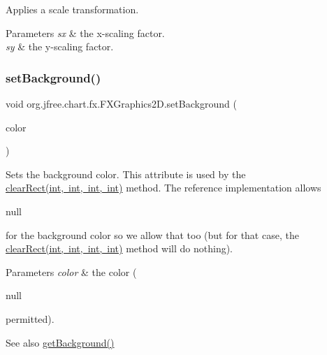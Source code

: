 Applies a scale transformation.


\begin{DoxyParams}{Parameters}
{\em sx} & the x-\/scaling factor. \\
\hline
{\em sy} & the y-\/scaling factor. \\
\hline
\end{DoxyParams}
\mbox{\label{classorg_1_1jfree_1_1chart_1_1fx_1_1_f_x_graphics2_d_a51d0f635dc7888223c326861aa4849f2}} 
\subsubsection{\texorpdfstring{set\+Background()}{setBackground()}}
{\footnotesize\ttfamily void org.\+jfree.\+chart.\+fx.\+F\+X\+Graphics2\+D.\+set\+Background (\begin{DoxyParamCaption}\item[{Color}]{color }\end{DoxyParamCaption})}

Sets the background color. This attribute is used by the \mbox{\hyperlink{classorg_1_1jfree_1_1chart_1_1fx_1_1_f_x_graphics2_d_afd91faf8ad68982c6c1be9931e7976c8}{clear\+Rect(int, int, int, int)}} method. The reference implementation allows
\begin{DoxyCode}
null 
\end{DoxyCode}
 for the background color so we allow that too (but for that case, the \mbox{\hyperlink{classorg_1_1jfree_1_1chart_1_1fx_1_1_f_x_graphics2_d_afd91faf8ad68982c6c1be9931e7976c8}{clear\+Rect(int, int, int, int)}} method will do nothing).


\begin{DoxyParams}{Parameters}
{\em color} & the color (
\begin{DoxyCode}
null 
\end{DoxyCode}
 permitted).\\
\hline
\end{DoxyParams}
\begin{DoxySeeAlso}{See also}
\mbox{\hyperlink{classorg_1_1jfree_1_1chart_1_1fx_1_1_f_x_graphics2_d_ad69034ac41815b09a4db1daae2877142}{get\+Background()}} 
\end{DoxySeeAlso}
\mbox{\label{classorg_1_1jfree_1_1chart_1_1fx_1_1_f_x_graphics2_d_a47e55ffaa4b2dcc54b53c506e4ed67be}} 
